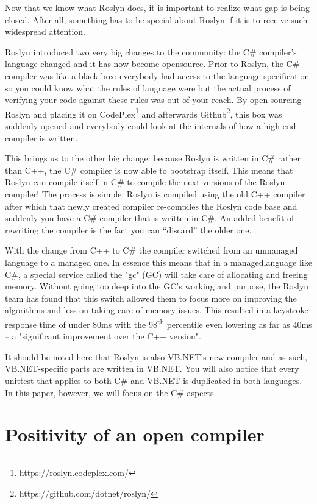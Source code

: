 Now that we know what Roslyn does, it is important to realize what gap is being closed. After all, something has to be special about Roslyn if it is to receive such widespread attention.

Roslyn introduced two very big changes to the community: the C\# compiler’s language changed and it has now become \gls{opensource}. Prior to Roslyn, the C\# compiler was like a black box: everybody had access to the language specification so you could know what the rules of language were but the actual process of verifying your code against these rules was out of your reach. By open-sourcing Roslyn and placing it on CodePlex\footnote{https://roslyn.codeplex.com/} and afterwards Github\footnote{https://github.com/dotnet/roslyn/}, this box was suddenly opened and everybody could look at the internals of how a high-end compiler is written.

This brings us to the other big change: because Roslyn is written in C\# rather than C++, the C\# compiler is now able to \gls{bootstrap} itself. This means that Roslyn can compile itself in C\# to compile the next versions of the Roslyn compiler! The process is simple: Roslyn is compiled using the old C++ compiler after which that newly created compiler re-compiles the Roslyn code base and suddenly you have a C\# compiler that is written in C\#. 
An added benefit of rewriting the compiler is the fact you can “discard” the older one.

With the change from C++ to C\# the \gls{compiler} switched from an unmanaged language to a managed one. In essence this means that in a \gls{managedlanguage} like C\#, a special service called the "\gls{gc}" (GC) will take care of allocating and freeing memory. Without going too deep into the GC's working and purpose, the Roslyn team has found that this switch allowed them to focus more on improving the algorithms and less on taking care of memory issues. This resulted in a keystroke response time of under 80ms with the 98\textsuperscript{th} percentile even lowering as far as 40ms -- a "significant improvement over the C++ version".\parencite{Wischik2014}

It should be noted here that Roslyn is also VB.NET's new compiler and as such, VB.NET-specific parts are written in VB.NET. You will also notice that every \gls{unittest} that applies to both C\# and VB.NET is duplicated in both languages. In this paper, however, we will focus on the C\# aspects.

\section{Positivity of an open compiler}
\label{sec:intro-pos-comp}

